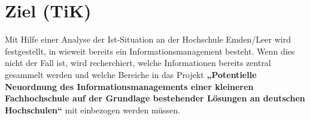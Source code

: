 \section{Ziel (TiK)}
Mit Hilfe einer Analyse der Ist-Situation an der Hochschule Emden/Leer wird festgestellt, in wieweit bereits ein Informationsmanagement besteht. Wenn dies nicht der Fall ist, wird recherchiert, welche Informationen bereits zentral gesammelt werden und welche Bereiche in das Projekt \textbf{„Potentielle Neuordnung des Informationsmanagements einer kleineren Fachhochschule auf der Grundlage bestehender Lösungen an deutschen Hochschulen“} mit einbezogen werden müssen.